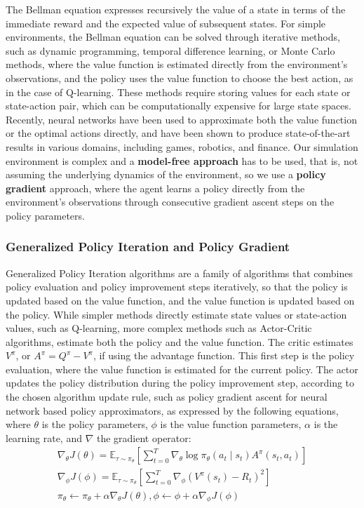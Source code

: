 The Bellman equation expresses recursively the value of a state in terms of the immediate reward and the expected value of subsequent states.
For simple environments, the Bellman equation can be solved through iterative methods, such as dynamic programming,
temporal difference learning, or Monte Carlo methods, where the value function is estimated directly from the environment's observations,
and the policy uses the value function to choose the best action, as in the case of Q-learning.
These methods require storing values for each state or state-action pair, which can be computationally expensive for large state spaces.
Recently, neural networks have been used to approximate both the value function or the optimal actions directly,
and have been shown to produce state-of-the-art results in various domains, including games, robotics, and finance.
Our simulation environment is complex and a \textbf{model-free approach} has to be used, that is, not assuming the underlying dynamics of the environment,
so we use a \textbf{policy gradient} approach, where the agent learns a policy directly from the environment's observations
through consecutive gradient ascent steps on the policy parameters.

\subsubsection{Generalized Policy Iteration and Policy Gradient}

Generalized Policy Iteration algorithms are a family of algorithms that combines policy evaluation and policy improvement steps iteratively,
so that the policy is updated based on the value function, and the value function is updated based on the policy.
While simpler methods directly estimate state values or state-action values, such as Q-learning, more complex methods
such as Actor-Critic algorithms, estimate both the policy and the value function.
The critic estimates $V^\pi$, or $A^{\pi} = Q^{\pi} - V^{\pi}$, if using the advantage function.
This first step is the policy evaluation, where the value function is estimated for the current policy.
The actor updates the policy distribution during the policy improvement step,
according to the chosen algorithm update rule, such as policy gradient ascent for neural network based policy approximators,
as expressed by the following equations,
where $\theta$ is the policy parameters, $\phi$ is the value function parameters,
$\alpha$ is the learning rate, and $\nabla$ the gradient operator:
\begin{gather*}
    \nabla_{\theta} J(\theta) = \mathbb{E}_{\tau \sim \pi_{\theta}} \left[ \sum_{t=0}^{T} \nabla_{\theta} \log \pi_{\theta}(a_t \mid s_t) A^{\pi}(s_t, a_t) \right]\\
    \nabla_{\phi} J(\phi) = \mathbb{E}_{\tau \sim \pi_{\theta}} \left[ \sum_{t=0}^{T} \nabla_{\phi} \left( V^{\pi}(s_t) - R_t \right)^2 \right]\\
    \pi_{\theta} \leftarrow \pi_{\theta} + \alpha \nabla_{\theta} J(\theta), \phi \leftarrow \phi + \alpha \nabla_{\phi} J(\phi)
\end{gather*}

